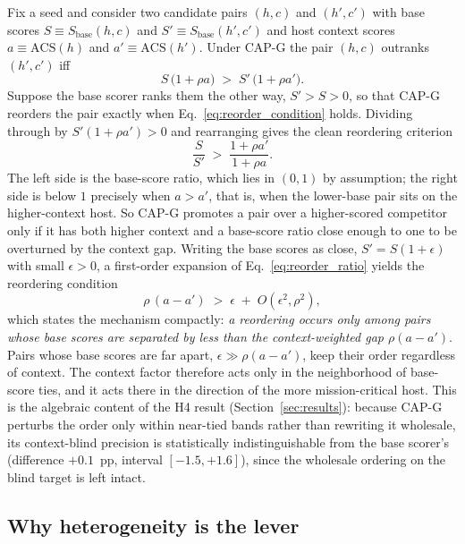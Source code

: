 Fix a seed and consider two candidate pairs $(h,c)$ and $(h',c')$ with base
scores $S\equiv S_{\mathrm{base}}(h,c)$ and $S'\equiv S_{\mathrm{base}}(h',c')$
and host context scores $a\equiv\mathrm{ACS}(h)$ and $a'\equiv\mathrm{ACS}(h')$.
Under CAP-G the pair $(h,c)$ outranks $(h',c')$ iff
%
\begin{equation}
\label{eq:reorder_condition}
S\,\bigl(1+\rho a\bigr)\;>\;S'\,\bigl(1+\rho a'\bigr).
\end{equation}
%
Suppose the base scorer ranks them the other way, $S'>S>0$, so that CAP-G
reorders the pair exactly when Eq.~\ref{eq:reorder_condition} holds. Dividing
through by $S'(1+\rho a')>0$ and rearranging gives the clean reordering
criterion
%
\begin{equation}
\label{eq:reorder_ratio}
\frac{S}{S'}\;>\;\frac{1+\rho a'}{1+\rho a}.
\end{equation}
%
The left side is the base-score ratio, which lies in $(0,1)$ by assumption; the
right side is below $1$ precisely when $a>a'$, that is, when the lower-base pair
sits on the higher-context host. So CAP-G promotes a pair over a higher-scored
competitor only if it has both higher context and a base-score ratio close
enough to one to be overturned by the context gap. Writing the base scores as
close, $S'=S(1+\epsilon)$ with small $\epsilon>0$, a first-order expansion of
Eq.~\ref{eq:reorder_ratio} yields the reordering condition
%
\begin{equation}
\label{eq:reorder_firstorder}
\rho\,(a-a')\;>\;\epsilon\;+\;O(\epsilon^2,\rho^2),
\end{equation}
%
which states the mechanism compactly: \emph{a reordering occurs only among pairs
whose base scores are separated by less than the context-weighted gap
$\rho(a-a')$}. Pairs whose base scores are far apart, $\epsilon\gg\rho(a-a')$,
keep their order regardless of context. The context factor therefore acts only
in the neighborhood of base-score ties, and it acts there in the direction of
the more mission-critical host. This is the algebraic content of the H4 result
(Section~\ref{sec:results}): because CAP-G perturbs the order only within
near-tied bands rather than rewriting it wholesale, its context-blind precision
is statistically indistinguishable from the base scorer's (difference
$+0.1$~pp, interval $[-1.5,+1.6]$), since the wholesale ordering on the blind
target is left intact.

\subsection{Why heterogeneity is the lever}
\label{sec:theory_heterogeneity}


